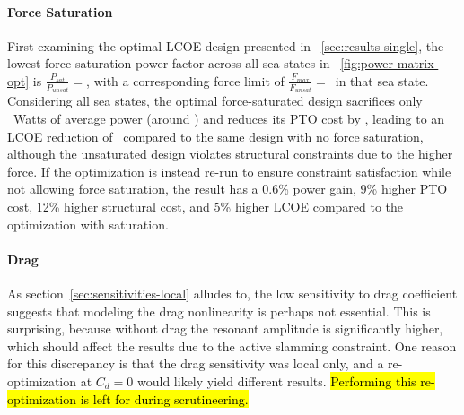 \paragraph{Force Saturation}
First examining the optimal LCOE design presented in \sectionautorefname~\ref{sec:results-single}, the lowest force saturation power factor across all sea states in \figureautorefname~\ref{fig:power-matrix-opt} is $\frac{P_{sat}}{P_{unsat}}=$\lowestFmaxFactorMinLCOE, with a corresponding force limit of $\frac{F_{max}}{F_{unsat}}=$\lowestFsatMinLCOE~in that sea state. 
Considering all sea states, the optimal force-saturated design sacrifices only \powerLossForceSatMinLCOE~Watts of average power (around \pctPowerLossForceSatMinLCOE) and reduces its PTO cost by \pctPTOSavingsForceSatMinLCOE, leading to an LCOE reduction of \pctImproveLCOEForceSatMinLCOE~compared to the same design with no force saturation, although the unsaturated design violates structural constraints due to the higher force.
If the optimization is instead re-run to ensure constraint satisfaction while not allowing force saturation, the result has a 0.6\% power gain, 9\% higher PTO cost, 12\% higher structural cost, and 5\% higher LCOE compared to the optimization with saturation.

\paragraph{Drag}
As section~\ref{sec:sensitivities-local} alludes to, the low sensitivity to drag coefficient suggests that modeling the drag nonlinearity is perhaps not essential.
This is surprising, because without drag the resonant amplitude is significantly higher, which should affect the results due to the active slamming constraint.
One reason for this discrepancy is that the drag sensitivity was local only, and a re-optimization at $C_d=0$ would likely yield different results.
\hl{Performing this re-optimization is left for during scrutineering.}

